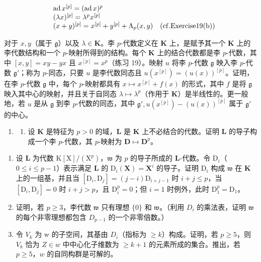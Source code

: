 \[
\begin{array}{r l} & {\operatorname{ad} x ^ {[ p ]} = (\operatorname{ad} x) ^ {p}} \\ & {(\lambda x) ^ {[ p ]} = \lambda^ {p} x ^ {[ p ]}} \\ & {(x + y) ^ {[ p ]} = x ^ {[ p ]} + y ^ {[ p ]} + \Lambda_ {p} (x, y) \quad (\mathrm{cf.Exercise19(b)})} \end{array}
\]

对于 \(x, y\)（属于 \(\mathfrak{g}\)）以及 \(\lambda \in \mathbf{K}\)。李 \(p\)-代数定义在 \(\mathbf{K}\) 上，是赋予其一个 \(\mathbf{K}\) 上的李代数结构和一个 \(p\)-映射所得到的结构。每个 \(\mathbf{K}\) 上的结合代数都是李 \(p\)-代数，其中 \([x, y] = xy - yx\) 且 \(x^{[p]} = x^p\)（练习 19）。映射 \(u\) 将李 \(p\)-代数 \(\mathfrak{g}\) 映入李 \(p\)-代数 \(\mathfrak{g}'\)；称为 \(p\)-同态，只要 \(u\) 是李代数同态且 \(u(x^{[p]}) = (u(x))^{[p]}\)。证明，在李 \(p\)-代数 \(\mathfrak{g}\) 中，每个 \(p\)-映射都具有 \(x \mapsto x^{[p]} + f(x)\) 的形式，其中 \(f\) 是将 \(\mathfrak{g}\) 映入其中心的映射，并且关于自同态 \(\lambda \mapsto \lambda^p\)（作用于 \(\mathbf{K}\)）是半线性的。更一般地，若 \(u\) 是从 \(\mathfrak{g}\) 到李 \(p\)-代数的同态，其中 \(\mathfrak{g}', u(x^{[p]}) - (u(x))^{[p]}\) 属于 \(\mathfrak{g}'\) 的中心。

\begin{enumerate}
\def\labelenumi{\arabic{enumi}.}
\setcounter{enumi}{20}
\tightlist
\item
  \begin{enumerate}
  \def\labelenumii{(\alph{enumii})}
  \tightlist
  \item
    设 \(\mathbf{K}\) 是特征为 \(p > 0\) 的域，\(\mathbf{L}\) 是 \(\mathbf{K}\) 上不必结合的代数。证明 \(\mathbf{L}\) 的导子构成一个李 \(p\)-代数，其 \(p\)-映射为 \(\mathbf{D} \mapsto \mathbf{D}^p\)。
  \end{enumerate}
\end{enumerate}

\begin{enumerate}
\def\labelenumi{(\alph{enumi})}
\setcounter{enumi}{1}
\item
  设 \(\mathbf{L}\) 为代数 \(\mathrm{K}[\mathrm{X}] / (\mathrm{X}^p)\)，\(\mathfrak{w}\) 为 \(p\) 的导子所成的 \(\mathbf{L}\)-代数。令 \(\mathrm{D}_i\)（\(0 \leqslant i \leqslant p - 1\)）表示满足 \(\mathbf{L}\) 的 \(\mathrm{D}_i(\mathbf{X}) = \mathbf{X}^i\) 的导子。证明 \(\mathrm{D}_i\) 构成 \(\mathfrak{w}\) 在 \(\mathbf{K}\) 上的一组基，并且当 \([\mathrm{D}_i, \mathrm{D}_j] = (j - i)\mathrm{D}_{i + j - 1}\) 时 \(i + j \leqslant p\)，当 \([\mathrm{D}_i, \mathrm{D}_j] = 0\) 时 \(i + j > p\)，且 \(\mathrm{D}_i^p = 0\)；但 \(i = 1\) 时例外，此时 \(\mathrm{D}_1^p = \mathrm{D}_1\)。
\item
  证明，若 \(p \geqslant 3\)，李代数 \(\mathfrak{w}\) 只有理想 \(\{0\}\) 和 \(\mathfrak{w}\)。（利用 \(D_i\) 的乘法表，证明 \(\mathfrak{w}\) 的每个非零理想都包含 \(D_{p-1}\) 的一个非零倍数。）
\item
令 \(V_{k}\) 为 w 的子空间，其基由 \(D_{i}\)（指标为 \(\geqslant k\)）构成。证明，若 \(p \geqslant 5\)，则 \(V_k\) 恰为 \(Z \in w\) 中中心化子维数为 \(\geqslant k + 1\) 的元素所成的集合。推出，若 \(p \geqslant 5\)，\(w\) 的自同构群是可解的。
\end{enumerate}

